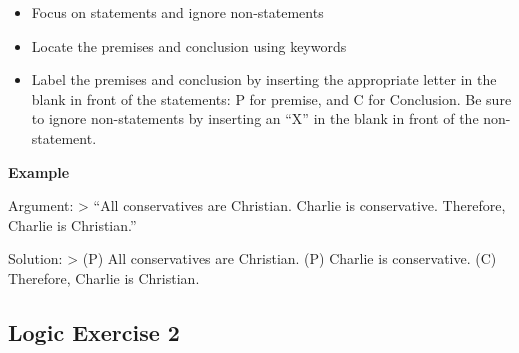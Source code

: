 \documentclass[
]{book}
\providecommand{\tightlist}{%
  \setlength{\itemsep}{0pt}\setlength{\parskip}{0pt}}
\begin{document}
\begin{reflect}
\begin{itemize}
\tightlist
\item
  Focus on statements and ignore non-statements
\item
  Locate the premises and conclusion using keywords
\item
  Label the premises and conclusion by inserting the appropriate letter in the blank in front of the statements: P for premise, and C for Conclusion. Be sure to ignore non-statements by inserting an ``X'' in the blank in front of the non-statement.
\end{itemize}

\textbf{Example}

Argument:
\textgreater{} ``All conservatives are Christian. Charlie is conservative. Therefore, Charlie is Christian.''

Solution:
\textgreater{} (P) All conservatives are Christian. (P) Charlie is conservative. (C) Therefore, Charlie is Christian.
\end{reflect}

\hypertarget{logic-exercise-2-1}{%
\subsection*{Logic Exercise 2}\label{logic-exercise-2-1}}
\end{document}
